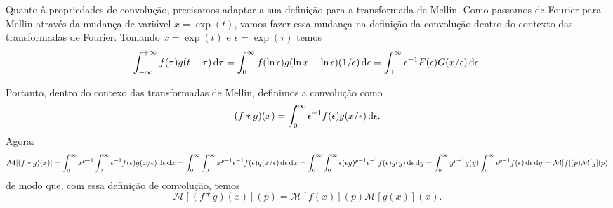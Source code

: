 Quanto à propriedades de convolução, precisamos adaptar a sua definição para a
transformada de Mellin. Como passamos de Fourier para Mellin através da mudança
de variável $x = \exp(t)$, vamos fazer essa mudança na definição da convolução
dentro do contexto das transformadas de Fourier. Tomando $x = \exp(t)$ e
$\epsilon = \exp(\tau)$ temos
\begin{dmath*}
  \int_{-\infty}^{+\infty} f(\tau) g(t - \tau) \vi{\tau} = \int_0^{\infty} f(\ln
  \epsilon) g(\ln x - \ln \epsilon) (1 / \epsilon) \vi{\epsilon}
  = \int_0^{\infty} \epsilon^{-1} F(\epsilon) G(x / \epsilon) \vi{\epsilon}.
\end{dmath*}

Portanto, dentro do contexo das transformadas de Mellin, definimos a convolução
como
\begin{dmath*}
  (f * g)(x) = \int_0^{\infty} \epsilon^{-1} f(\epsilon) g(x / \epsilon)
  \vi{\epsilon}.
\end{dmath*}
Agora:
\begin{dmath*}
  \mathcal{M}[(f * g)(x)] = \int_0^{\infty} x^{p - 1} \int_0^{\infty}
  \epsilon^{-1} f(\epsilon) g(x / \epsilon) \vi{\epsilon} \vi{x}
  = \int_0^{\infty} \int_0^{\infty} x^{p - 1} \epsilon^{-1} f(\epsilon) g(x /
  \epsilon) \vi{\epsilon} \vi{x}
  = \int_0^{\infty} \int_0^{\infty} \epsilon (\epsilon y)^{p - 1} \epsilon^{-1}
  f(\epsilon) g(y) \vi{\epsilon} \vi{y}
  = \int_0^{\infty} y^{p - 1} g(y) \int_0^{\infty} \epsilon^{p - 1} f(\epsilon)
  \vi{\epsilon} \vi{y}
  = \mathcal{M}[f](p) \mathcal{M}[g](p)
\end{dmath*}
de modo que, com essa definição de convolução, temos
\begin{dmath*}
  \mathcal{M}[(f * g)(x)](p) = \mathcal{M}[f(x)](p) \mathcal{M}[g(x)](x).
\end{dmath*}

